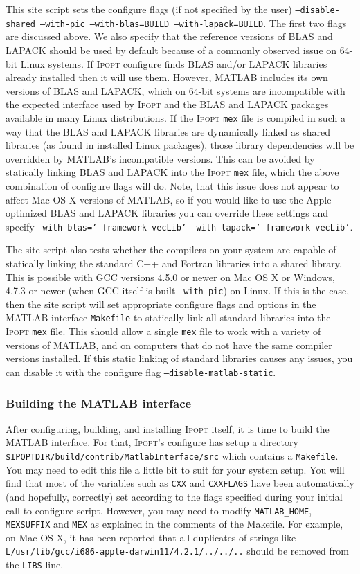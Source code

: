 \documentclass[10pt]{article}
\newcommand{\Ipopt}{\textsc{Ipopt}\xspace}
\newcommand{\Matlab}{\textsc{MATLAB}\xspace}
\begin{document}
This site script sets the configure flags (if not specified by the user)
{\tt --disable-shared --with-pic --with-blas=BUILD --with-lapack=BUILD}.
The first two flags are discussed above. We also specify that the reference
versions of BLAS and LAPACK should be used by default because of a commonly
observed issue on 64-bit Linux systems. If \Ipopt configure finds BLAS and/or
LAPACK libraries already installed then it will use them. However, \Matlab
includes its own versions of BLAS and LAPACK, which on 64-bit systems are
incompatible with the expected interface used by \Ipopt and the BLAS and LAPACK
packages available in many Linux distributions. If the \Ipopt { \tt mex} file is
compiled in such a way that the BLAS and LAPACK libraries are dynamically linked
as shared libraries (as found in installed Linux packages), those library
dependencies will be overridden by \Matlab's incompatible versions. This can
be avoided by statically linking BLAS and LAPACK into the \Ipopt { \tt mex} file,
which the above combination of configure flags will do. Note, that this issue does
not appear to affect Mac OS X versions of \Matlab, so if you would like to use
the Apple optimized BLAS and LAPACK libraries you can override these settings and
specify {\tt --with-blas='-framework vecLib' --with-lapack='-framework vecLib'}.

The site script also tests whether the compilers on your system are capable of
statically linking the standard C++ and Fortran libraries into a shared library.
This is possible with GCC versions 4.5.0 or newer on Mac OS X or Windows, 4.7.3 or newer
(when GCC itself is built {\tt --with-pic}) on Linux. If this is the case, then
the site script will set appropriate configure flags and options in the \Matlab
interface {\tt Makefile} to statically link all standard libraries into the \Ipopt { \tt mex}
file. This should allow a single {\tt mex} file to work with a variety of versions of
\Matlab, and on computers that do not have the same compiler versions installed.
If this static linking of standard libraries causes any issues, you can disable
it with the configure flag {\tt --disable-matlab-static}.

\subsubsection{Building the \Matlab interface}

After configuring, building, and installing \Ipopt itself, it is time to build 
the \Matlab interface.
For that, \Ipopt's configure has setup a directory
{\tt \$IPOPTDIR/build/contrib/MatlabInterface/src} which contains a
{\tt Makefile}.
You may need to edit this file a little bit to suit for your system setup. You 
will find that most of the variables such as {\tt CXX} and {\tt CXXFLAGS} have 
been automatically (and hopefully, correctly) set according to the flags 
specified during your initial call to configure script.
However, you may need to modify {\tt MATLAB\_HOME}, {\tt MEXSUFFIX} and
{\tt MEX} as explained in the comments of the Makefile.
For example, on Mac OS X, it has been reported that all duplicates of strings 
like {\tt -L/usr/lib/gcc/i686-apple-darwin11/4.2.1/../../..} should be removed 
from the {\tt LIBS} line.
\end{document}
